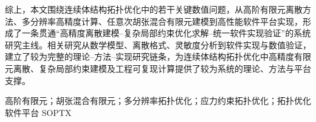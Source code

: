 \begin{cnabstract}
综上，本文围绕连续体结构拓扑优化中的若干关键数值问题，从高阶有限元离散方法、多分辨率高精度计算、任意次胡张混合有限元建模到高性能软件平台实现，形成了一条贯通“高精度离散建模--复杂局部约束优化求解--统一软件实现验证”的系统研究主线。相关研究从数学模型、离散格式、灵敏度分析到软件实现与数值验证，建立了较为完整的理论--方法--实现研究链条，为连续体结构拓扑优化中高精度有限元离散、复杂局部约束建模及工程可复现计算提供了较为系统的理论、方法与平台支撑。

\end{cnabstract}

\begin{cnkeywords}
	高阶有限元；胡张混合有限元；多分辨率拓扑优化；应力约束拓扑优化；拓扑优化软件平台 SOPTX
\end{cnkeywords}

\newpage
